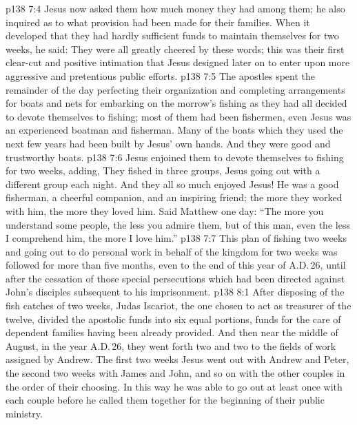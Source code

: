 \vs p138 7:4 Jesus now asked them how much money they had among them; he also inquired as to what provision had been made for their families. When it developed that they had hardly sufficient funds to maintain themselves for two weeks, he said:  They were all greatly cheered by these words; this was their first clear\hyp{}cut and positive intimation that Jesus designed later on to enter upon more aggressive and pretentious public efforts.
\vs p138 7:5 The apostles spent the remainder of the day perfecting their organization and completing arrangements for boats and nets for embarking on the morrow’s fishing as they had all decided to devote themselves to fishing; most of them had been fishermen, even Jesus was an experienced boatman and fisherman. Many of the boats which they used the next few years had been built by Jesus’ own hands. And they were good and trustworthy boats.
\vs p138 7:6 Jesus enjoined them to devote themselves to fishing for two weeks, adding,  They fished in three groups, Jesus going out with a different group each night. And they all so much enjoyed Jesus! He was a good fisherman, a cheerful companion, and an inspiring friend; the more they worked with him, the more they loved him. Said Matthew one day: “The more you understand some people, the less you admire them, but of this man, even the less I comprehend him, the more I love him.”
\vs p138 7:7 This plan of fishing two weeks and going out to do personal work in behalf of the kingdom for two weeks was followed for more than five months, even to the end of this year of A.D.\,26, until after the cessation of those special persecutions which had been directed against John’s disciples subsequent to his imprisonment.
\vs p138 8:1 After disposing of the fish catches of two weeks, Judas Iscariot, the one chosen to act as treasurer of the twelve, divided the apostolic funds into six equal portions, funds for the care of dependent families having been already provided. And then near the middle of August, in the year A.D.\,26, they went forth two and two to the fields of work assigned by Andrew. The first two weeks Jesus went out with Andrew and Peter, the second two weeks with James and John, and so on with the other couples in the order of their choosing. In this way he was able to go out at least once with each couple before he called them together for the beginning of their public ministry.
